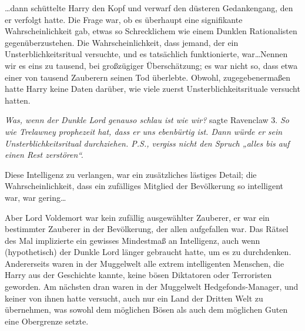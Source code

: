 …dann schüttelte Harry den Kopf und verwarf den düsteren Gedankengang, den er verfolgt hatte. Die Frage war, ob es überhaupt eine signifikante Wahrscheinlichkeit gab, etwas so Schrecklichem wie einem Dunklen Rationalisten gegenüberzustehen. Die Wahrscheinlichkeit, dass jemand, der ein Unsterblichkeitsritual versuchte, und es tatsächlich funktionierte, war…Nennen wir es eins zu tausend, bei großzügiger Überschätzung; es war nicht so, dass etwa einer von tausend Zauberern seinen Tod überlebte. Obwohl, zugegebenermaßen hatte Harry keine Daten darüber, wie viele zuerst Unsterblichkeitsrituale versucht hatten.

\emph{Was, wenn der Dunkle Lord genauso schlau ist wie wir?} sagte Ravenclaw 3. \emph{So wie Trelawney prophezeit hat, dass er uns ebenbürtig ist. Dann würde er sein Unsterblichkeitsritual durchziehen. P.S., vergiss nicht den Spruch „alles bis auf einen Rest zerstören“.}

Diese Intelligenz zu verlangen, war ein zusätzliches lästiges Detail; die Wahrscheinlichkeit, dass ein zufälliges Mitglied der Bevölkerung so intelligent war, war gering…

Aber Lord Voldemort war kein zufällig ausgewählter Zauberer, er war ein bestimmter Zauberer in der Bevölkerung, der allen aufgefallen war. Das Rätsel des Mal implizierte ein gewisses Mindestmaß an Intelligenz, auch wenn (hypothetisch) der Dunkle Lord länger gebraucht hatte, um es zu durchdenken. Andererseits waren in der Muggelwelt alle extrem intelligenten Menschen, die Harry aus der Geschichte kannte, keine bösen Diktatoren oder Terroristen geworden. Am nächsten dran waren in der Muggelwelt Hedgefonds-Manager, und keiner von ihnen hatte versucht, auch nur ein Land der Dritten Welt zu übernehmen, was sowohl dem möglichen Bösen als auch dem möglichen Guten eine Obergrenze setzte.

